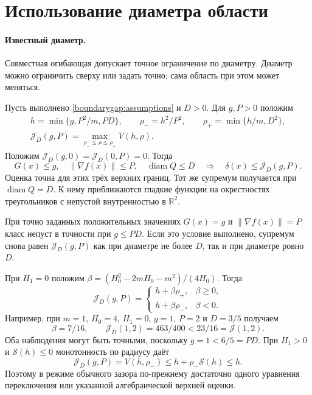 \section{Использование диаметра области}
\label{compact:diameter}

\paragraph{Известный диаметр.}
Совместная огибающая допускает точное ограничение по диаметру.
Диаметр можно ограничить сверху или задать точно; сама область
при этом может меняться.

\begin{theorem}
\label{jointdiam:main}
Пусть выполнено \eqref{boundarygap:assumptions} и $D>0$.
Для $g,P>0$ положим
\begin{equation}\label{jointdiam:definition}
 \begin{gathered}
 h=\min\{g,P^2/m,PD\},\qquad
 \rho_-=h^2/P^2,\qquad \rho_+=\min\{h/m,D^2\},\\
 \mathcal J_D(g,P)=\max_{\rho_-\le\rho\le\rho_+}V(h,\rho).
 \end{gathered}
\end{equation}
Положим $\mathcal J_D(g,0)=\mathcal J_D(0,P)=0$. Тогда
\[
 G(x)\le g,\quad \|\nabla f(x)\|\le P,\quad
 \operatorname{diam}Q\le D
 \quad\Longrightarrow\quad
 \delta(x)\le\mathcal J_D(g,P).
\]
Оценка точна для этих трёх верхних границ. Тот же супремум
получается при $\operatorname{diam}Q=D$. К нему приближаются
гладкие функции на окрестностях треугольников с непустой
внутренностью в $\mathbb R^2$.

При точно заданных положительных значениях $G(x)=g$ и
$\|\nabla f(x)\|=P$ класс непуст в точности при $g\le PD$.
Если это условие выполнено, супремум снова равен
$\mathcal J_D(g,P)$ как при диаметре не более $D$,
так и при диаметре ровно $D$.
\end{theorem}

При $H_1=0$ положим
$\beta=(H_0^2-2mH_0-m^2)/(4H_0)$. Тогда
\begin{equation}\label{jointdiam:constant}
 \mathcal J_D(g,P)=
 \begin{cases}
 h+\beta\rho_+,&\beta\ge0,\\
 h+\beta\rho_-,&\beta<0.
 \end{cases}
\end{equation}
Например, при $m=1$, $H_0=4$, $H_1=0$, $g=1$, $P=2$ и
$D=3/5$ получаем
\[
 \beta=7/16,\qquad
 \mathcal J_D(1,2)=463/400<23/16=\mathcal J(1,2).
\]
Оба наблюдения могут быть точными, поскольку $g=1<6/5=PD$.
При $H_1>0$ и $\mathcal S(h)\le0$ монотонность по радиусу даёт
\begin{equation}\label{jointdiam:ordinary}
 \mathcal J_D(g,P)=V(h,\rho_-)
       \le h+\rho_-\mathcal S(h)\le h.
\end{equation}
Поэтому в режиме обычного зазора по-прежнему достаточно одного
уравнения переключения или указанной алгебраической верхней оценки.

